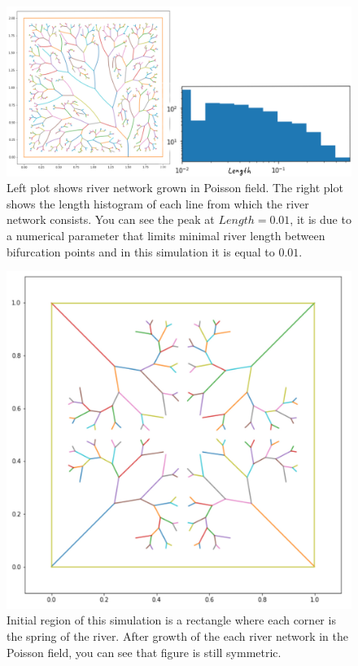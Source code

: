\documentclass[]{pracamgr}
\begin{document}
        \begin{figure}[H]
          \centering
          \includegraphics[width=1\textwidth]{figs/histogram.jpg}        
          \caption{Left plot shows river network grown in Poisson field. The right plot shows the length histogram of each line from which the river network consists. You can see the peak at $Length = 0.01$, it is due to a numerical parameter that limits minimal river length between bifurcation points and in this simulation it is equal to $0.01$.}
        \end{figure}

        \begin{figure}[H]
          \centering
          \includegraphics[width=1\textwidth]{figs/symmetic_rivers.jpg}        
          \caption{Initial region of this simulation is a rectangle where each corner is the spring of the river. After growth of the each river network in the Poisson field, you can see that figure is still symmetric.}
        \end{figure}
\end{document}
